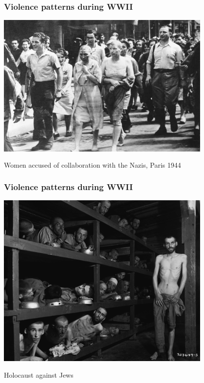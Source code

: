 \documentclass[aspectratio=43]{beamer}
\begin{document}
\begin{frame}
\frametitle{Violence patterns during WWII}
\centering

\includegraphics[width = 0.8\textwidth]{img/wwii-womencolab}

Women accused of collaboration with the Nazis, Paris 1944

\end{frame}

\begin{frame}
\frametitle{Violence patterns during WWII}
\centering

\includegraphics[width = 0.8\textwidth]{img/wwii-holocaust}

Holocaust against Jews

\end{frame}
\end{document}
